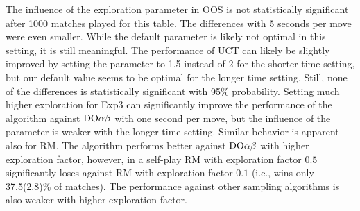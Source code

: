 The influence of the exploration parameter in OOS is not statistically significant after 1000 matches played for this table. The differences with 5 seconds per move were even smaller. While the default parameter is likely not optimal in this setting, it is still meaningful.
The performance of UCT can likely be slightly improved by setting the parameter to 1.5 instead of 2 for the shorter time setting, but our default value seems to be optimal for the longer time setting. Still, none of the differences is statistically significant with 95\% probability.
Setting much higher exploration for Exp3 can significantly improve the performance of the algorithm against $\textrm{DO}\alpha\beta$ with one second per move, but the influence of the parameter is weaker with the longer time setting. 
Similar behavior is apparent also for RM. The algorithm performs better against $\textrm{DO}\alpha\beta$ with higher exploration factor, however, in a self-play RM with exploration factor $0.5$ significantly loses against RM with exploration factor $0.1$ (i.e., wins only 37.5(2.8)\% of matches).
The performance against other sampling algorithms is also weaker with higher exploration factor.



